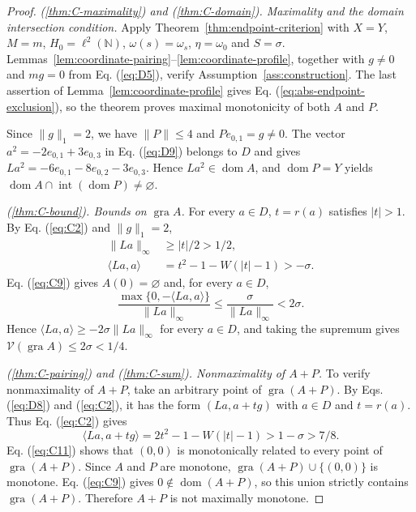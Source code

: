 \documentclass[11pt]{article}
\newcommand{\N}{\mathbb N}
\newcommand{\gra}{\operatorname{gra}}
\newcommand{\dom}{\operatorname{dom}}
\newcommand{\pair}[2]{\langle #1,#2\rangle}
\theoremstyle{definition}
\theoremstyle{remark}
\begin{document}
\begin{proof}
\noindent\textit{\textup{(\ref{thm:C-maximality})} and \textup{(\ref{thm:C-domain})}. Maximality and the domain intersection condition.}
Apply Theorem~\ref{thm:endpoint-criterion} with $X=Y$, $M=m$, $H_0=\ell^2(\N)$, $\omega(s)=\omega_s$, $\eta=\omega_0$ and $S=\sigma$. Lemmas~\ref{lem:coordinate-pairing}--\ref{lem:coordinate-profile}, together with $g\ne0$ and $mg=0$ from Eq. (\ref{eq:D5}), verify Assumption~\ref{ass:construction}. The last assertion of Lemma~\ref{lem:coordinate-profile} gives Eq. (\ref{eq:abs-endpoint-exclusion}), so the theorem proves maximal monotonicity of both $A$ and $P$.

\label{sec:C6}
Since $\|g\|_1=2$, we have $\|P\|\le4$ and $Pe_{0,1}=g\ne0$. The vector $a^2=-2e_{0,1}+3e_{0,3}$ in Eq. (\ref{eq:D9}) belongs to $D$ and gives $La^2=-6e_{0,1}-8e_{0,2}-3e_{0,3}$. Hence $La^2\in\dom A$, and $\dom P=Y$ yields $\dom A\cap\operatorname{int}(\dom P)\ne\varnothing$.

\noindent\textit{\textup{(\ref{thm:C-bound})}. Bounds on $\gra A$.}
\label{sec:C5}
For every $a\in D$, $t=r(a)$ satisfies $|t|>1$. By Eq. (\ref{eq:C2}) and $\|g\|_1=2$,
\begin{equation}
\begin{aligned}
\|La\|_\infty&\ge|t|/2>1/2,\\
\pair{La}{a}&=t^2-1-W(|t|-1)>-\sigma.
\end{aligned}
\label{eq:C9}
\end{equation}
Eq. (\ref{eq:C9}) gives $A(0)=\varnothing$ and, for every $a\in D$,
\[
\frac{\max\{0,-\pair{La}{a}\}}{\|La\|_\infty}
\le \frac{\sigma}{\|La\|_\infty}
<2\sigma.
\]
Hence $\pair{La}{a}\ge-2\sigma\|La\|_\infty$ for every $a\in D$, and taking the supremum gives $\mathcal V(\gra A)\le2\sigma<1/4$.

\noindent\textit{\textup{(\ref{thm:C-pairing})} and \textup{(\ref{thm:C-sum})}. Nonmaximality of $A+P$.}
To verify nonmaximality of $A+P$, take an arbitrary point of $\gra(A+P)$. By Eqs. (\ref{eq:D8}) and (\ref{eq:C2}), it has the form $(La,a+tg)$ with $a\in D$ and $t=r(a)$. Thus Eq. (\ref{eq:C2}) gives
\begin{equation}
\pair{La}{a+tg}=2t^2-1-W(|t|-1)>1-\sigma>7/8.
\label{eq:C11}
\end{equation}
Eq. (\ref{eq:C11}) shows that $(0,0)$ is monotonically related to every point of $\gra(A+P)$. Since $A$ and $P$ are monotone, $\gra(A+P)\cup\{(0,0)\}$ is monotone. Eq. (\ref{eq:C9}) gives $0\notin\dom(A+P)$, so this union strictly contains $\gra(A+P)$. Therefore $A+P$ is not maximally monotone.
\end{proof}
\end{document}
